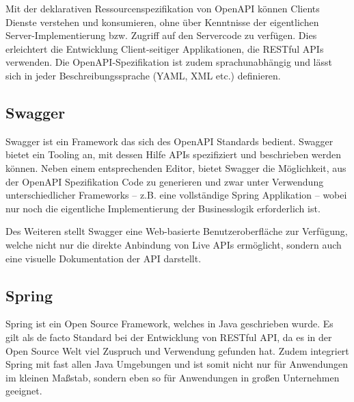 			Mit der deklarativen Ressourcenspezifikation von OpenAPI können Clients Dienste verstehen und konsumieren, ohne über Kenntnisse der eigentlichen Server-Implementierung bzw. Zugriff auf den Servercode zu verfügen. Dies erleichtert die Entwicklung Client-seitiger Applikationen, die RESTful APIs verwenden. Die OpenAPI-Spezifikation ist zudem sprachunabhängig und lässt sich in jeder Beschreibungssprache (YAML, XML etc.) definieren. 
	
		\subsection{Swagger}
		
			Swagger ist ein Framework das sich des OpenAPI Standards bedient. Swagger bietet ein Tooling an, mit dessen Hilfe APIs spezifiziert und beschrieben werden können. Neben einem entsprechenden Editor, bietet Swagger die Möglichkeit, aus der OpenAPI Spezifikation Code zu generieren und zwar unter Verwendung unterschiedlicher Frameworks -- z.B. eine vollständige Spring Applikation -- wobei nur noch die eigentliche Implementierung der Businesslogik erforderlich ist.
			
			Des Weiteren stellt Swagger eine Web-basierte Benutzeroberfläche zur Verfügung, welche nicht nur die direkte Anbindung von Live APIs ermöglicht, sondern auch eine visuelle Dokumentation der API darstellt. \cite{SmartBear.2020}
	
		\subsection{Spring}
		
			Spring ist ein Open Source Framework, welches in Java geschrieben wurde. Es gilt als de facto Standard bei der Entwicklung von RESTful API, da es in der Open Source Welt viel Zuspruch und Verwendung gefunden hat. Zudem integriert Spring mit fast allen Java Umgebungen und ist somit nicht nur für Anwendungen im kleinen Maßstab, sondern eben so für Anwendungen in großen Unternehmen geeignet. \cite{Walls.20162017} 
			
